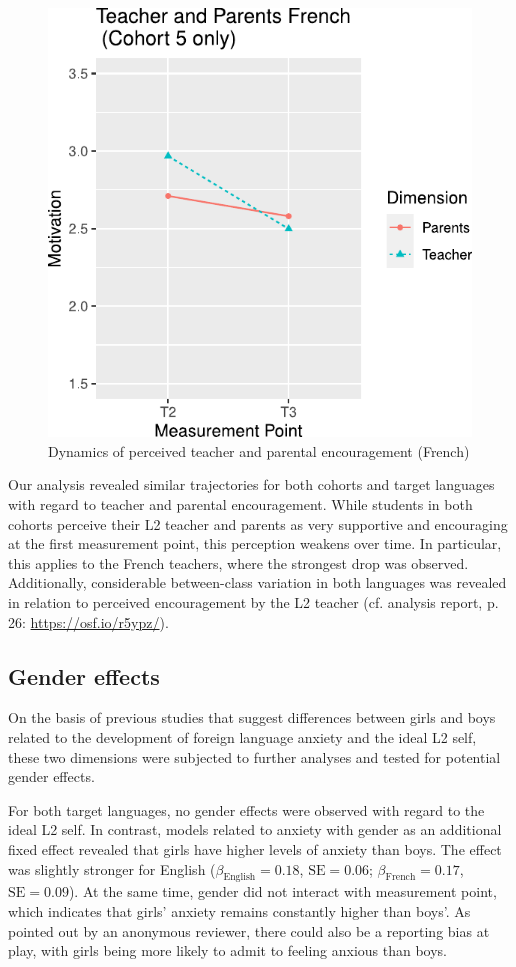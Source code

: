 \documentclass[output=paper]{langsci/langscibook}
\begin{document}
  
\begin{figure}
\includegraphics[width=.5\textwidth]{figures/Fig8.4.pdf}
\caption{Dynamics of perceived teacher and parental encouragement (French)\label{fig:08:4}}
\end{figure}

Our analysis revealed similar trajectories for both cohorts and target languages with regard to teacher and parental encouragement. While students in both cohorts perceive their L2 teacher and parents as very supportive and encouraging at the first measurement point, this perception weakens over time. In particular, this applies to the French teachers, where the strongest drop was observed. Additionally, considerable between-class variation in both languages was revealed in relation to perceived encouragement by the L2 teacher (cf. analysis report, p. 26: \url{https://osf.io/r5ypz/}).

\subsection{Gender effects}

On the basis of previous studies that suggest differences between girls and boys related to the development of foreign language anxiety and the ideal L2 self, these two dimensions were subjected to further analyses and tested for potential gender effects. 

For both target languages, no gender effects were observed with regard to the ideal L2 self. In contrast, models related to anxiety with gender as an additional fixed effect revealed that girls have higher levels of anxiety than boys. The effect was slightly stronger for English ($\beta_{\text{English}}=0.18$, $\text{SE}=0.06$; $\beta_{\text{French}}=0.17$, $\text{SE}=0.09$). At the same time, gender did not interact with measurement point, which indicates that girls’ anxiety remains constantly higher than boys’. As pointed out by an anonymous reviewer, there could also be a reporting bias at play, with girls being more likely to admit to feeling anxious than boys.
\end{document}
